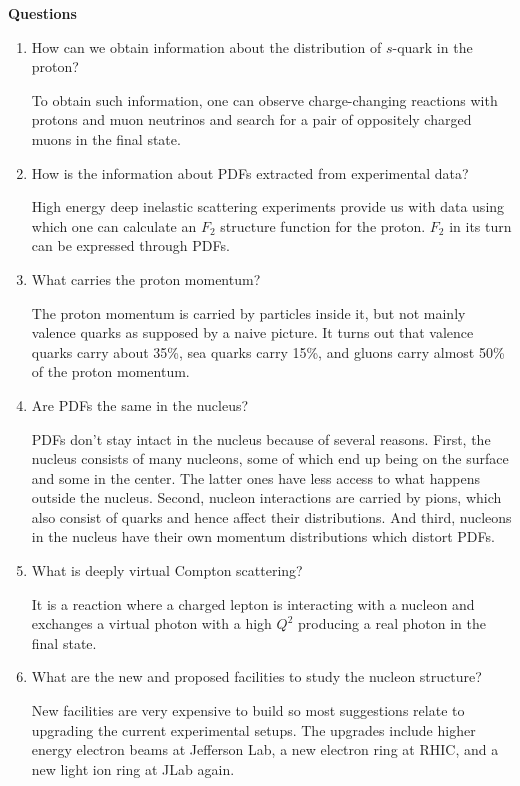 \documentclass[a4paper, 12pt]{article}
\begin{document}
\begin{center}
	\textbf{Questions}
\end{center}
\begin{enumerate}
	\item How can we obtain information about the distribution of 
		$s$-quark in the proton?

		To obtain such information, one can observe charge-changing 
		reactions with protons and muon neutrinos and search for a pair of 
		oppositely charged muons in the final state.

	\item How is the information about PDFs extracted from experimental data?

		High energy deep inelastic scattering experiments provide us with 
		data using which one can calculate an $F_2$ structure function for 
		the proton. $F_2$ in its turn can be expressed through PDFs.

	\item What carries the proton momentum?

		The proton momentum is carried by particles inside it, but not 
		mainly valence quarks as supposed by a naive picture. It turns out 
		that valence quarks carry about 35\%, sea quarks carry 15\%, and 
		gluons carry almost 50\% of the proton momentum.

	\item Are PDFs the same in the nucleus?

		PDFs don't stay intact in the nucleus because of several reasons. 
		First, the nucleus consists of many nucleons, some of which end up 
		being on the surface and some in the center. The latter ones have 
		less access to what happens outside the nucleus. Second, nucleon 
		interactions are carried by pions, which also consist of quarks and 
		hence affect their distributions. And third, nucleons in the 
		nucleus have their own momentum distributions which distort PDFs.

	\item What is deeply virtual Compton scattering?

		It is a reaction where a charged lepton is interacting with 
		a nucleon and exchanges a virtual photon with a high $Q^2$ 
		producing a real photon in the final state.

	\item What are the new and proposed facilities to study the nucleon 
		structure?

		New facilities are very expensive to build so most suggestions 
		relate to upgrading the current experimental setups. The upgrades 
		include higher energy electron beams at Jefferson Lab, a new 
		electron ring at RHIC, and a new light ion ring at JLab again.
\end{enumerate}
\end{document}
